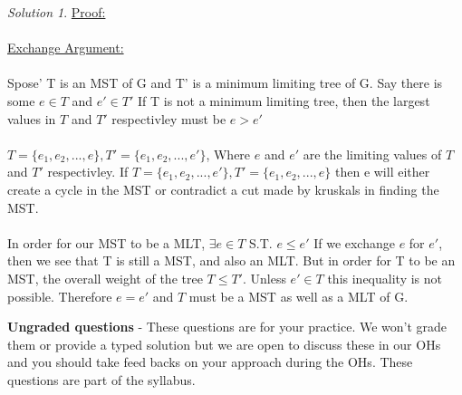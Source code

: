\documentclass[12pt]{article}
\theoremstyle{remark}
\newtheorem*{solution}{Solution}
\begin{document}
\begin{enumerate}
\begin{enumerate}
\begin{solution}
\underline{Proof:} \\ \\ \underline{Exchange Argument:} \\ \\ Spose' T is an MST of G and T' is a minimum limiting tree of G. Say there is some $e \in T$ and $e' \in T'$ If T is not a minimum limiting tree, then the largest values in $T$ and $T'$ respectivley must be $e > e'$ \\ \\ $T=\{e_1, e_2, ... , e\}, T' = \{e_1, e_2, ... , e'\}$, Where $e$ and $e'$ are the limiting values of $T$ and $T'$ respectivley. If $T= \{e_1,e_2,...,e'\}, T'=\{e_1,e_2,...,e\}$ then e will either create a cycle in the MST or contradict a cut made by kruskals in finding the MST. \\ \\In order for our MST to be a MLT, $\exists e \in T$ S.T. $e \leq e'$ If we exchange $e$ for $e'$, then we see that T is still a MST, and also an MLT. But in order for T to be an MST, the overall weight of the tree $T \leq T'$. Unless $e' \in T$ this inequality is not possible. Therefore $e = e'$ and $T$ must be a MST as well as a MLT of G.
\end{solution}

\end{enumerate}

\end{enumerate}

\pagebreak
\textbf{Ungraded questions} - These questions are for your practice. We won't grade them or provide a typed solution but we are open to discuss these in our OHs and you should take feed backs on your approach during the OHs. These questions are part of the syllabus. 
\end{document}
